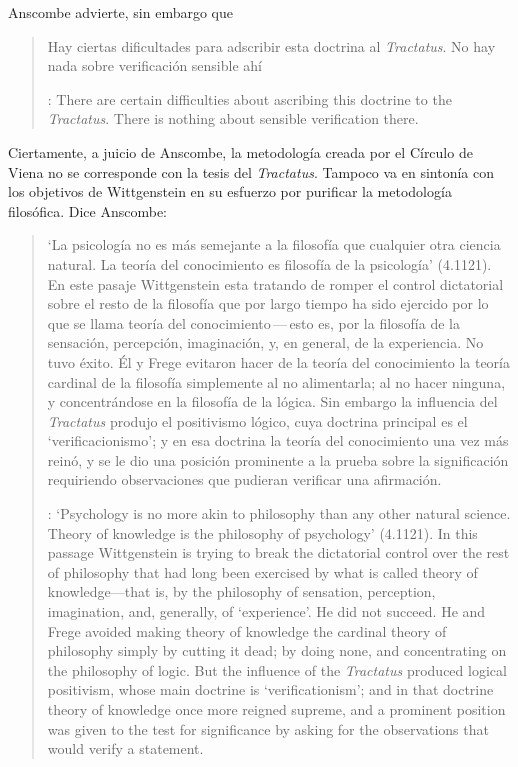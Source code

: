 Anscombe advierte, sin embargo que \blockquote[{\cite[150]{anscombe1959iwt}}: There are certain difficulties about ascribing this doctrine to the \emph{Tractatus}. There is nothing about sensible verification there.]{Hay ciertas dificultades para adscribir esta doctrina al \emph{Tractatus}. No hay nada sobre verificación sensible ahí}. Ciertamente, a juicio de Anscombe, la metodología creada por el Círculo de Viena no se corresponde con la tesis del \emph{Tractatus}. Tampoco va en sintonía con los objetivos de Wittgenstein en su esfuerzo por purificar la metodología filosófica. Dice Anscombe: \blockquote[{\cite[152]{anscombe1959iwt}}: `Psychology is no more akin to philosophy than any other natural science. Theory of knowledge is the philosophy of psychology' (4.1121). In this passage Wittgenstein is trying to break the dictatorial control over the rest of philosophy that had long been exercised by what is called theory of knowledge---that is, by the philosophy of sensation, perception, imagination, and, generally, of `experience'. He did not succeed. He and Frege avoided making theory of knowledge the cardinal theory of philosophy simply by cutting it dead; by doing none, and concentrating on the philosophy of logic. But the influence of the \emph{Tractatus} produced logical positivism, whose main doctrine is `verificationism'; and in that doctrine theory of knowledge once more reigned supreme, and a prominent position was given to the test for significance by asking for the observations that would verify a statement.]{`La psicología no es más semejante a la filosofía que cualquier otra ciencia natural. La teoría del conocimiento es filosofía de la psicología' (4.1121). En este pasaje Wittgenstein esta tratando de romper el control dictatorial sobre el resto de la filosofía que por largo tiempo ha sido ejercido por lo que se llama teoría del conocimiento\,---\,esto es, por la filosofía de la sensación, percepción, imaginación, y, en general, de la experiencia. No tuvo éxito. Él y Frege evitaron hacer de la teoría del conocimiento la teoría cardinal de la filosofía simplemente al no alimentarla; al no hacer ninguna, y concentrándose en la filosofía de la lógica. Sin embargo la influencia del \emph{Tractatus} produjo el positivismo lógico, cuya doctrina principal es el `verificacionismo'; y en esa doctrina la teoría del conocimiento una vez más reinó, y se le dio una posición prominente a la prueba sobre la significación requiriendo observaciones que pudieran verificar una afirmación.}

